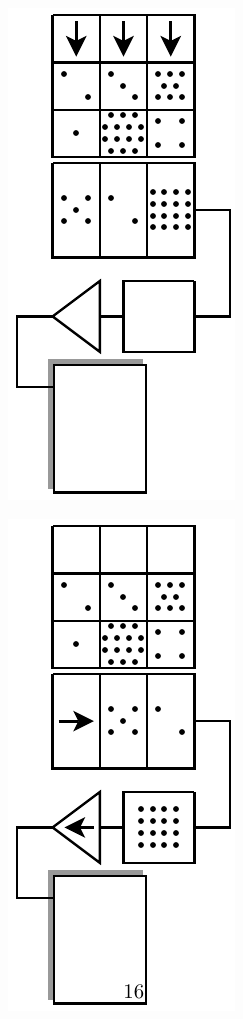 \begin{figure}[htpb]
\begin{subfigure}[t]{0.5\textwidth}
		\includegraphics[scale=1.0]{ccd-registry-2.pdf}
		\caption{}
	\end{subfigure}
	\begin{subfigure}[t]{0.25\textwidth}
		\centering
		\includegraphics[scale=1.0]{ccd-registry-3.pdf}

\end{subfigure}
\end{figure}
